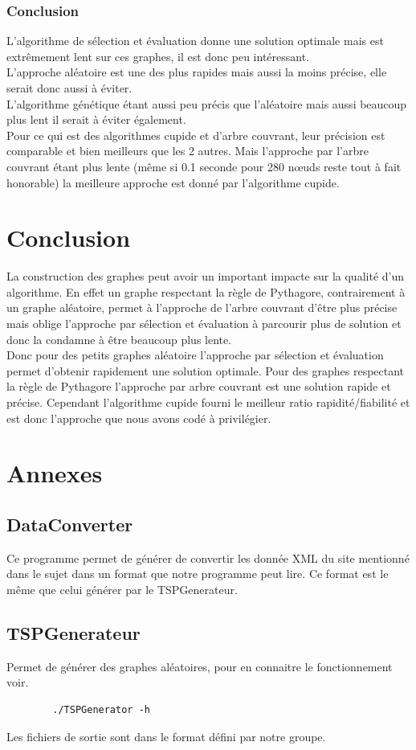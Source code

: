 \documentclass[10pt,a4paper]{report}
\begin{document}
	\subsubsection{Conclusion}
	L'algorithme de sélection et évaluation donne une solution optimale mais est extrêmement lent sur ces graphes, il est donc peu intéressant.\\
	L'approche aléatoire est une des plus rapides mais aussi la moins précise, elle serait donc aussi à éviter.\\
	L'algorithme génétique étant aussi peu précis que l'aléatoire mais aussi beaucoup plus lent il serait à éviter également.\\
	Pour ce qui est des algorithmes cupide et d'arbre couvrant, leur précision est comparable et bien meilleurs que les 2 autres. Mais l'approche par l'arbre couvrant étant plus lente (même si 0.1 seconde pour 280 nœuds reste tout à fait honorable) la meilleure approche est donné par l'algorithme cupide.
	
	
\section{Conclusion}
La construction des graphes peut avoir un important impacte sur la qualité d'un algorithme. En effet un graphe respectant la règle de Pythagore, contrairement à un graphe aléatoire, permet à l'approche de l'arbre couvrant d'être plus précise mais oblige l'approche par sélection et évaluation à parcourir plus de solution et donc la condamne à être beaucoup plus lente.\\

Donc pour des petits graphes aléatoire l'approche par sélection et évaluation permet d'obtenir rapidement une solution optimale. Pour des graphes respectant la règle de Pythagore l'approche par arbre couvrant est une solution rapide et précise.
Cependant l'algorithme cupide fourni le meilleur ratio rapidité/fiabilité et est donc l'approche que nous avons codé à privilégier.

\section{Annexes}

	\subsection{DataConverter}
	\begin{flushleft}
	Ce programme permet de générer de convertir les donnée XML du site mentionné dans le sujet dans un format que notre programme peut lire. Ce format est le même que celui générer par le TSPGenerateur.
	\end{flushleft}
	
	\subsection{TSPGenerateur}
	Permet de générer des graphes aléatoires, pour en connaitre le fonctionnement voir.
	\begin{verbatim}
		./TSPGenerator -h
	\end{verbatim}
	Les fichiers de sortie sont dans le format défini par notre groupe.
\end{document}
